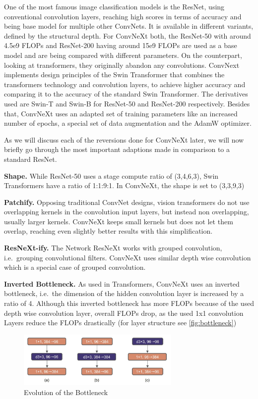 \documentclass{article}
\begin{document}
One of the most famous image classification models is the ResNet, using conventional convolution layers, reaching high scores in terms of accuracy and being base model for multiple other ConvNets.
It is available in different variants, defined by the structural depth.
For ConvNeXt both, the ResNet-50 with around 4.5e9 FLOPs and ResNet-200 having around 15e9 FLOPs are used as a base model and are being compared with different parameters.
On the counterpart, looking at transformers, they originally abandon any convolutions.
ConvNext implements design principles of the Swin Transformer that combines the transformers technology and convolution layers, to achieve higher accuracy and comparing it to the accuracy of the standard Swin Transformer.
The derivatives used are Swin-T and Swin-B for ResNet-50 and ResNet-200 respectively.
Besides that, ConvNeXt uses an adapted set of training parameters like an increased number of epochs, a special set of data augmentation and the AdamW optimizer.

As we will discuss each of the reversions done for ConvNeXt later, we will now briefly go through the most important adaptions made in comparison to a standard ResNet.

\textbf{Shape.}
While ResNet-50 uses a stage compute ratio of (3,4,6,3), Swin Transformers have a ratio of 1:1:9:1.
In ConvNeXt, the shape is set to (3,3,9,3)

\textbf{Patchify.}
Opposing traditional ConvNet designs, vision transformers do not use overlapping kernels in the convolution input layers, but instead non overlapping, usually larger kernels.
ConvNeXt keeps small kernels but does not let them overlap, reaching even slightly better results with this simplification.

\textbf{ResNeXt-ify.}
The Network ResNeXt works with grouped convolution, i.e.\ grouping convolutional filters.
ConvNeXt uses similar depth wise convolution which is a special case of grouped convolution.

\textbf{Inverted Bottleneck.}
As used in Transformers, ConvNeXt uses an inverted bottleneck, i.e.\ the dimension of the hidden convolution layer is increased by a ratio of 4.
Although this inverted bottleneck has more FLOPs because of the used depth wise convolution layer, overall FLOPs drop, as the used 1x1 convolution Layers reduce the FLOPs drastically (for layer structure see \autoref{fig:bottleneck})
\begin{figure}[h]
    \centering
    \includegraphics[width=0.7\textwidth]{images/bottleneck}
    \caption{Evolution of the Bottleneck\cite{liu2022convnet}}
    \label{fig:bottleneck}
\end{figure}
\end{document}
